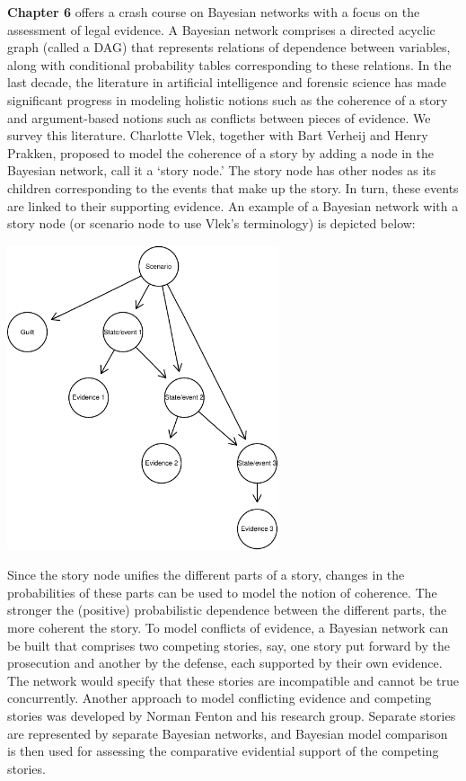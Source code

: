 \documentclass[
  10pt,
  dvipsnames,enabledeprecatedfontcommands]{scrartcl}
\begin{document}
\textbf{Chapter 6} offers a crash course on Bayesian networks with a
focus on the assessment of legal evidence. A Bayesian network comprises
a directed acyclic graph (called a DAG) that represents relations of
dependence between variables, along with conditional probability tables
corresponding to these relations. In the last decade, the literature in
artificial intelligence and forensic science has made significant
progress in modeling holistic notions such as the coherence of a story
and argument-based notions such as conflicts between pieces of evidence.
We survey this literature. Charlotte Vlek, together with Bart Verheij
and Henry Prakken, proposed to model the coherence of a story by adding
a node in the Bayesian network, call it a `story node.' The story node
has other nodes as its children corresponding to the events that make up
the story. In turn, these events are linked to their supporting
evidence. An example of a Bayesian network with a story node (or
scenario node to use Vlek's terminology) is depicted below:

\vspace{-2mm}

\begin{center}
\includegraphics[width=8cm]{vlek-scenario-node.pdf}
 \end{center}

\vspace{-2mm}

\noindent Since the story node unifies the different parts of a story,
changes in the probabilities of these parts can be used to model the
notion of coherence. The stronger the (positive) probabilistic
dependence between the different parts, the more coherent the story. To
model conflicts of evidence, a Bayesian network can be built that
comprises two competing stories, say, one story put forward by the
prosecution and another by the defense, each supported by their own
evidence. The network would specify that these stories are incompatible
and cannot be true concurrently. Another approach to model conflicting
evidence and competing stories was developed by Norman Fenton and his
research group. Separate stories are represented by separate Bayesian
networks, and Bayesian model comparison is then used for assessing the
comparative evidential support of the competing stories.
\end{document}
